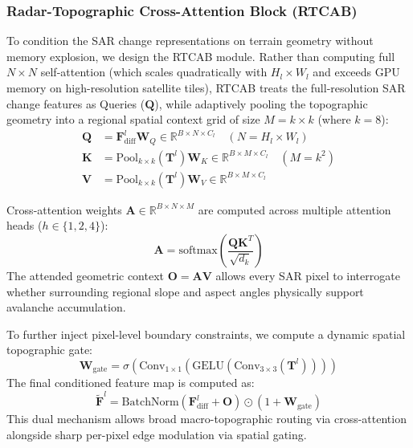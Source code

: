 \subsubsection{Radar-Topographic Cross-Attention Block (RTCAB)}
To condition the SAR change representations on terrain geometry without memory explosion, we design the RTCAB module. Rather than computing full $N \times N$ self-attention (which scales quadratically with $H_l \times W_l$ and exceeds GPU memory on high-resolution satellite tiles), RTCAB treats the full-resolution SAR change features as Queries ($\mathbf{Q}$), while adaptively pooling the topographic geometry into a regional spatial context grid of size $M = k \times k$ (where $k=8$):
\begin{align}
\mathbf{Q} &= \mathbf{F}^l_{\text{diff}} \mathbf{W}_Q \in \mathbb{R}^{B \times N \times C_l} \quad (N = H_l \times W_l) \\
\mathbf{K} &= \text{Pool}_{k \times k}(\mathbf{T}^l) \mathbf{W}_K \in \mathbb{R}^{B \times M \times C_l} \quad (M = k^2) \\
\mathbf{V} &= \text{Pool}_{k \times k}(\mathbf{T}^l) \mathbf{W}_V \in \mathbb{R}^{B \times M \times C_l}
\end{align}

Cross-attention weights $\mathbf{A} \in \mathbb{R}^{B \times N \times M}$ are computed across multiple attention heads ($h \in \{1, 2, 4\}$):
\begin{equation}
\mathbf{A} = \text{softmax}\left( \frac{\mathbf{Q} \mathbf{K}^T}{\sqrt{d_k}} \right)
\end{equation}
The attended geometric context $\mathbf{O} = \mathbf{A} \mathbf{V}$ allows every SAR pixel to interrogate whether surrounding regional slope and aspect angles physically support avalanche accumulation. 

To further inject pixel-level boundary constraints, we compute a dynamic spatial topographic gate:
\begin{equation}
\mathbf{W}_{\text{gate}} = \sigma \left( \text{Conv}_{1 \times 1} \left( \text{GELU} \left( \text{Conv}_{3 \times 3} (\mathbf{T}^l) \right) \right) \right)
\end{equation}
The final conditioned feature map is computed as:
\begin{equation}
\mathbf{\tilde{F}}^l = \text{BatchNorm} \left( \mathbf{F}^l_{\text{diff}} + \mathbf{O} \right) \odot (1 + \mathbf{W}_{\text{gate}})
\end{equation}
This dual mechanism allows broad macro-topographic routing via cross-attention alongside sharp per-pixel edge modulation via spatial gating.

